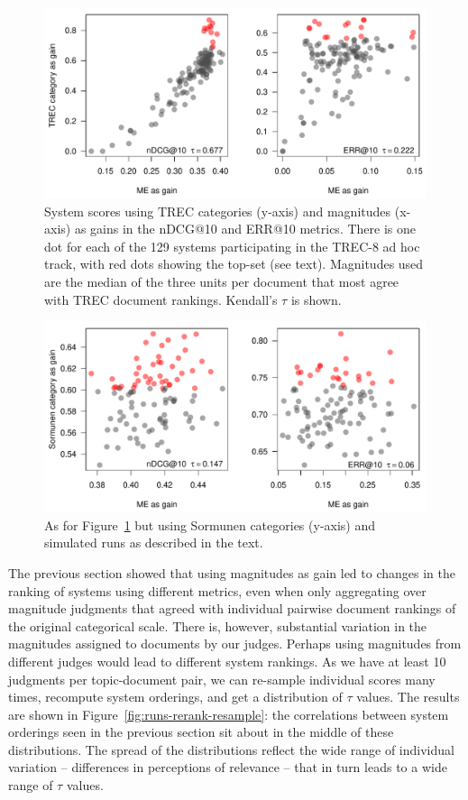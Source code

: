 \begin{figure}[tbp]
  \centering
  \includegraphics[width=.6\linewidth]{figs/sysRank_scatter_TREC_med3bestME.pdf}
  \caption{System scores using TREC categories (y-axis) 
    and magnitudes (x-axis) as gains in 
    the nDCG@10 and ERR@10 metrics. There is one dot for each of the 129 systems 
    participating in the TREC-8 ad hoc track, with red dots showing the top-set (see text).
    Magnitudes used are the median of the three units per document that most agree with TREC
    document rankings.
    Kendall's $\tau$ is shown. 
  \label{fig:runs-rerank-median3best}
  }
\end{figure}
\begin{figure}[tbp]
  \centering
  \includegraphics[width=.6\linewidth]{figs/sysRank_scatter_FAKE_medME3bestME.pdf}
  \caption{As for Figure~\ref{fig:runs-rerank-median3best} but using 
           Sormunen categories (y-axis) and simulated runs as described in the text.
  \label{fig:runs-rerank-median3best-fake}
  }
\end{figure}


The previous section showed that using magnitudes as gain led to
changes in the ranking of systems using different metrics, even when
only aggregating over magnitude judgments that agreed with individual pairwise
document rankings of the original categorical scale.
There is, however, substantial variation in the magnitudes assigned to documents
by our judges.
Perhaps using magnitudes from different judges would lead to different 
system rankings. 
As we have at least 10 judgments per topic-document pair, we can
re-sample individual scores many times, recompute system orderings, and
get a distribution of $\tau$ values.
The results are shown in Figure~\ref{fig:runs-rerank-resample}: the
correlations between system orderings seen in the previous section sit about in the middle 
of these distributions.
The spread of the distributions reflect the wide range of individual variation -- differences in
perceptions of relevance -- that in turn leads to a wide range of
$\tau$ values.

